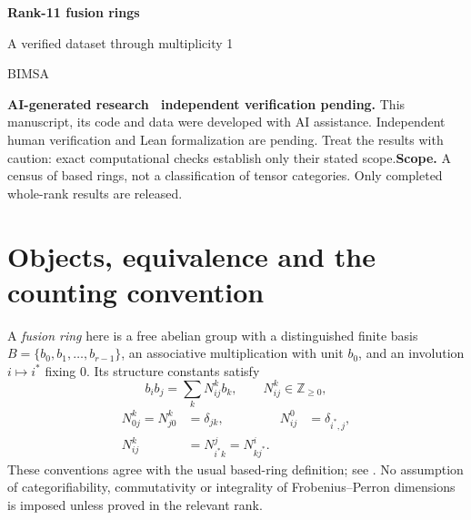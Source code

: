 \documentclass[11pt,a4paper]{article}
\theoremstyle{definition}\newtheorem{definition}[theorem]{Definition}\newtheorem{remark}[theorem]{Remark}
\newcommand{\NN}{\mathbb Z_{\geq0}}\newcommand{\FPdim}{\operatorname{FPdim}}
\begin{document}
\par\vspace{1cm}
{\sffamily\Huge\bfseries\color{ink} Rank-11 fusion rings\par}
\vspace{0.35cm}
{\sffamily\Large A verified dataset through multiplicity 1\par}
\vspace{0.65cm}{\large Sébastien Palcoux}\par{\small BIMSA}\par\vspace{0.35cm}{\small Computational companion, 26 October 2026}\par\vspace{0.8cm}
\begin{abstract}
We document 182 verified based-isomorphism classes of fusion rings of rank 11 through multiplicity 1, including 182 at the maximum multiplicity. The producer reports a complete enumeration. The complete optimized source is supplied and hash-matched, but full enumeration has not been independently reproduced. The account separates the mathematical coverage argument, the completed search, and independent verification of the emitted tensors. All duality types are included, and no categorifiability filter is applied. Code, machine-readable counts, full multiplication tensors and provenance records accompany the text.
\end{abstract}\vspace{0.4cm}\noindent\textbf{AI-generated research \textperiodcentered\ independent verification pending.} This manuscript, its code and data were developed with AI assistance. Independent human verification and Lean formalization are pending. Treat the results with caution: exact computational checks establish only their stated scope.\vfill\noindent\textbf{Scope.} A census of based rings, not a classification of tensor categories. Only completed whole-rank results are released.\newpage\tableofcontents\newpage

\section{Objects, equivalence and the counting convention}
A \emph{fusion ring} here is a free abelian group with a distinguished finite basis
$B=\{b_0,b_1,\ldots,b_{r-1}\}$, an associative multiplication with unit $b_0$,
and an involution $i\mapsto i^*$ fixing $0$. Its structure constants satisfy
\[
b_i b_j=\sum_k N_{ij}^{k}b_k,\qquad N_{ij}^{k}\in\NN,
\]
\begin{align}
N_{0j}^{k}=N_{j0}^{k}&=\delta_{jk},&N_{ij}^{0}&=\delta_{i^*,j},\\
N_{ij}^{k}&=N_{i^*k}^{j}=N_{kj^*}^{i}.&&\label{eq:reciprocity}
\end{align}
These conventions agree with the usual based-ring definition; see
\cite{EGNO,VS}. No assumption of categorifiability, commutativity or integrality
of Frobenius--Perron dimensions is imposed unless proved in the relevant rank.
\end{document}
